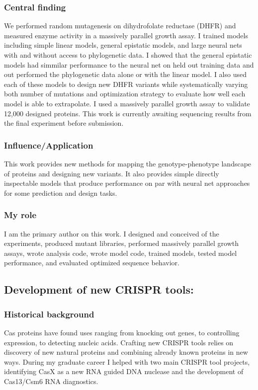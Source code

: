 \documentclass{article}
\begin{document}
\subsubsection{Central finding}
We performed random mutagenesis on dihydrofolate reductase (DHFR) and measured enzyme activity in a massively parallel growth assay. 
I trained models including simple linear models, general epistatic models, and large neural nets with and without access to phylogenetic data. 
I showed that the general epistatic models had simmilar performance to the neural net on held out training data and out performed the phylogenetic data alone or with the linear model. 
I also used each of these models to design new DHFR variants while systematically varying both number of mutations and optimization strategy to evaluate how well each model is able to extrapolate.
I used a massively parallel growth assay to validate 12,000 designed proteins.
This work is currently awaiting sequencing results from the final experiment before submission.
%
\subsubsection{Influence/Application}
This work provides new methods for mapping the genotype-phenotype landscape of proteins and designing new variants.
It also provides simple directly inspectable models that produce performance on par with neural net approaches for some prediction and design tasks.
%
\subsubsection{My role}
I am the primary author on this work.
I designed and conceived of the experiments, produced mutant libraries, performed massively parallel growth assays, wrote analysis code, wrote model code, trained models, tested model performance, and evaluated optimized sequence behavior.
%

\leavevmode\pagebreak


\newrefsection
\subsection{Development of new CRISPR tools:}
\subsubsection{Historical background}
Cas proteins have found uses ranging from knocking out genes, to controlling expression, to detecting nucleic acids.
Crafting new CRISPR tools relies on discovery of new natural proteins and combining already known proteins in new ways.
During my graduate career I helped with two main CRISPR tool projects, identifying CasX as a new RNA guided DNA nuclease and the development of Cas13/Csm6 RNA diagnostics.
%
\end{document}
